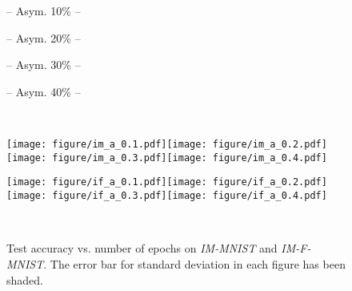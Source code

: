 \documentclass[11pt]{article}
\begin{document}
\begin{figure*}[!t]
\begin{minipage}[c]{0.08\columnwidth}~\end{minipage}\centering{}
\begin{minipage}[c]{0.05\columnwidth}~\end{minipage}\begin{minipage}[c]{0.235\textwidth}\centering\small -- \scriptsize{Asym. 10\%} -- \end{minipage}\begin{minipage}[c]{0.235\textwidth}\centering\small -- \scriptsize{Asym. 20\%} -- \end{minipage}\begin{minipage}[c]{0.235\textwidth}\centering\small -- \scriptsize{Asym. 30\%} -- \end{minipage}
    \begin{minipage}[c]{0.235\textwidth}\centering\small -- \scriptsize{Asym. 40\%} -- \end{minipage}\\
    \begin{minipage}[c]{0.05\columnwidth}\centering\small {} \end{minipage}\begin{minipage}[c]{0.95\textwidth}
        \texttt{[image: figure/im\_a\_0.1.pdf]}\texttt{[image: figure/im\_a\_0.2.pdf]}\texttt{[image: figure/im\_a\_0.3.pdf]}\texttt{[image: figure/im\_a\_0.4.pdf]}\end{minipage}

\begin{minipage}[c]{0.05\columnwidth}\centering\small {} \end{minipage}\begin{minipage}[c]{0.95\textwidth}
        \texttt{[image: figure/if\_a\_0.1.pdf]}\texttt{[image: figure/if\_a\_0.2.pdf]}\texttt{[image: figure/if\_a\_0.3.pdf]}\texttt{[image: figure/if\_a\_0.4.pdf]}\end{minipage}\\

\caption{Test accuracy vs. number of epochs on \textit{IM-MNIST} and \textit{IM-F-MNIST}. The error bar for standard deviation in each figure has been shaded. 
    }
\vspace{-15pt}
\label{fig:imbalanced_dataset}
\end{figure*}
\end{document}
